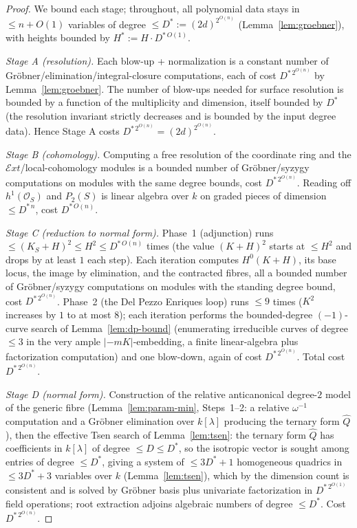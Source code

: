 \documentclass{amsart}
\theoremstyle{plain}
\theoremstyle{definition}
\newcommand{\cO}{\mathcal{O}}
\begin{document}
\begin{proof}
We bound each stage; throughout, all polynomial data stays in $\le n+O(1)$
variables of degree $\le D^*:=(2d)^{2^{O(n)}}$ (Lemma~\ref{lem:groebner}), with
heights bounded by $H^*:=H\cdot D^{*\,O(1)}$.

\emph{Stage A (resolution).}  Each blow-up + normalization is a constant number
of Gr\"obner/elimination/integral-closure computations, each of cost
$D^{*\,2^{O(n)}}$ by Lemma~\ref{lem:groebner}.  The number of blow-ups needed for
surface resolution is bounded by a function of the multiplicity and dimension,
itself bounded by $D^*$ (the resolution invariant strictly decreases and is
bounded by the input degree data).  Hence Stage A costs $D^{*\,2^{O(n)}}=
(2d)^{2^{O(n)}}$.

\emph{Stage B (cohomology).}  Computing a free resolution of the coordinate ring
and the $\mathcal{E}xt$/local-cohomology modules is a bounded number of
Gr\"obner/syzygy computations on modules with the same degree bounds, cost
$D^{*\,2^{O(n)}}$.  Reading off $h^1(\cO_S)$ and $P_2(S)$ is linear algebra over
$k$ on graded pieces of dimension $\le D^{*\,n}$, cost $D^{*\,O(n)}$.

\emph{Stage C (reduction to normal form).}  Phase~1 (adjunction) runs
$\le(K_S+H)^2\le H^2\le D^{*\,O(n)}$ times (the value $(K+H)^2$ starts at $\le
H^2$ and drops by at least $1$ each step).  Each iteration computes $H^0(K+H)$,
its base locus, the image by elimination, and the contracted fibres, all a
bounded number of Gr\"obner/syzygy computations on modules with the standing
degree bound, cost $D^{*\,2^{O(n)}}$.  Phase~2 (the Del Pezzo Enriques loop)
runs $\le9$ times ($K^2$ increases by $1$ to at most $8$); each iteration
performs the bounded-degree $(-1)$-curve search of Lemma~\ref{lem:dp-bound}
(enumerating irreducible curves of degree $\le3$ in the very ample
$|{-mK}|$-embedding, a finite linear-algebra plus factorization computation) and
one blow-down, again of cost $D^{*\,2^{O(n)}}$.  Total cost $D^{*\,2^{O(n)}}$.

\emph{Stage D (normal form).}  Construction of the relative anticanonical
degree-$2$ model of the generic fibre (Lemma~\ref{lem:param-min}, Steps~1--2:
a relative $\omega^{-1}$ computation and a Gr\"obner elimination over
$k[\lambda]$ producing the ternary form $\widehat Q$), then the
effective Tsen search of Lemma~\ref{lem:tsen}: the ternary form $\widehat Q$ has
coefficients in $k[\lambda]$ of degree $\le D\le D^*$, so the isotropic vector is
sought among entries of degree $\le D^*$, giving a system of $\le 3D^*+1$
homogeneous quadrics in $\le 3D^*+3$ variables over $k$ (Lemma~\ref{lem:tsen}),
which by the dimension count is consistent and is solved by Gr\"obner basis
plus univariate factorization in $D^{*\,2^{O(1)}}$ field operations; root
extraction adjoins algebraic numbers of degree $\le D^*$.  Cost
$D^{*\,2^{O(n)}}$.


\end{proof}
\end{document}
